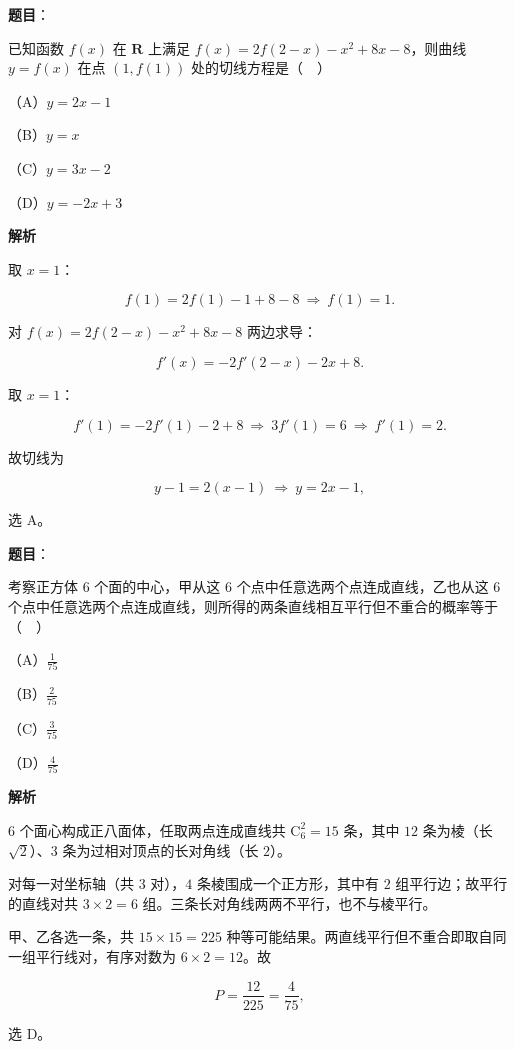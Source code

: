 \begin{answer}

\textbf{题目}：

已知函数 $f(x)$ 在 $\mathbf R$ 上满足 $f(x)=2f(2-x)-x^2+8x-8$，则曲线 $y=f(x)$ 在点 $(1,f(1))$ 处的切线方程是（　）

（A）$y=2x-1$

（B）$y=x$

（C）$y=3x-2$

（D）$y=-2x+3$

\textbf{解析}

取 $x=1$：

\nopagebreak[4]
\[f(1)=2f(1)-1+8-8\ \Longrightarrow\ f(1)=1 .\]

对 $f(x)=2f(2-x)-x^2+8x-8$ 两边求导：

\nopagebreak[4]
\[f'(x)=-2f'(2-x)-2x+8 .\]

取 $x=1$：

\nopagebreak[4]
\[f'(1)=-2f'(1)-2+8\ \Longrightarrow\ 3f'(1)=6\ \Longrightarrow\ f'(1)=2 .\]

故切线为

\nopagebreak[4]
\[y-1=2(x-1)\ \Longrightarrow\ y=2x-1,\]

选 A。


\end{answer}
\begin{answer}

\textbf{题目}：

考察正方体 $6$ 个面的中心，甲从这 $6$ 个点中任意选两个点连成直线，乙也从这 $6$ 个点中任意选两个点连成直线，则所得的两条直线相互平行但不重合的概率等于（　）

（A）$\frac1{75}$

（B）$\frac2{75}$

（C）$\frac3{75}$

（D）$\frac4{75}$

\textbf{解析}

$6$ 个面心构成正八面体，任取两点连成直线共 $\mathrm C_6^2=15$ 条，其中 $12$ 条为棱（长 $\sqrt2$）、$3$ 条为过相对顶点的长对角线（长 $2$）。

对每一对坐标轴（共 $3$ 对），$4$ 条棱围成一个正方形，其中有 $2$ 组平行边；故平行的直线对共 $3\times2=6$ 组。三条长对角线两两不平行，也不与棱平行。

甲、乙各选一条，共 $15\times15=225$ 种等可能结果。两直线平行但不重合即取自同一组平行线对，有序对数为 $6\times2=12$。故

\nopagebreak[4]
\[P=\frac{12}{225}=\frac{4}{75},\]

选 D。


\end{answer}
